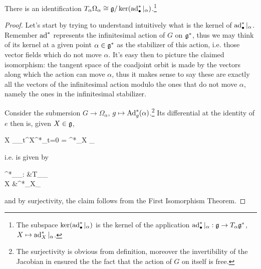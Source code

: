 \documentclass[main.tex]{subfiles}
\begin{document}
\begin{theorem}
\label{th:coadj_is_tangent}
	There is an identification $T_\alpha \Omega_\alpha \overset{}{\cong} \mathfrak g / \ker (\operatorname{ad}^*_\bullet\vert_\alpha)$.\footnote{The subspace $ \ker (\operatorname{ad}^*_\bullet\vert_\alpha)$ is the kernel of the application $\operatorname{ad}^*_\bullet\vert_\alpha : \mathfrak g \to T_\alpha\mathfrak g^*$, $X \mapsto \operatorname{ad}^*_X\vert_\alpha$.}
\end{theorem}
\begin{proof}
	Let's start by trying to understand intuitively what is the kernel of $\operatorname{ad}^*_\bullet\vert_\alpha$. Remember $\operatorname{ad}^*$ represents the infinitesimal action of $G$ on $\mathfrak g^*$, thus we may think of its kernel at a given point $\alpha \in \mathfrak g^*$ as the stabilizer of this action, i.e. those vector fields which do not move $\alpha$. It's easy then to picture the claimed isomorphism: the tangent space of the coadjoint orbit is made by the vectors along which the action can move $\alpha$, thus it makes sense to say these are exactly all the vectors of the infinitesimal action modulo the ones that do not move $\alpha$, namely the ones in the infinitesimal stabilizer.

	Consider the submersion $G \to \Omega_\alpha$, $g \mapsto \operatorname{Ad}_g^*(\alpha)$.\footnote{The surjectivity is obvious from definition, moreover the invertibility of the Jacobian in ensured the the fact that the action of $G$ on itself is free.} 
	Its differential at the identity of $e$ then is, given $X \in \mathfrak g$,
	\begin{eqalign}
		X \longmapsto {} \Ad_{\phi_t^X}^*\alpha \vert_{t=0} = \ad^*_X \vert_\alpha
	\end{eqalign}
	i.e. is given by
	\begin{eqalign}
	\label{eq:coadj_map_lalg_to_Torbits}
		\ad^*_\bullet\vert_\alpha : \lalg &\longto T_\alpha \Omega_\alpha\\
		X &\longmapsto \ad^*_X\vert_\alpha
	\end{eqalign}
	and by surjectivity, the claim follows from the First Isomorphism Theorem.
\end{proof}
\end{document}
